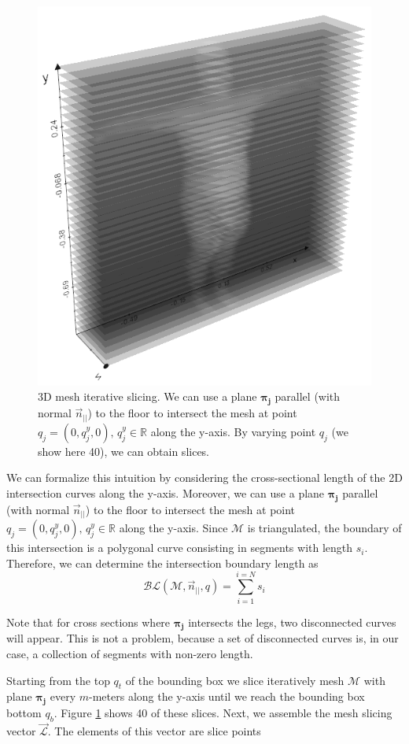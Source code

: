 \documentclass[runningheads, orivec]{llncs}
\begin{document}
\begin{figure}[H]
	\begin{center}
		\includegraphics[width=0.5\linewidth]{subject_2_with_cutting_planes_xrays.png}
	\end{center}
	\caption{3D mesh iterative slicing. We 
		can use a plane $\boldsymbol{\pi_j}$ parallel (with normal 
		$\vec{n}_{||}$) to the 
		floor to intersect the mesh at point $q_j = (0, q^y_j, 0), \,  q^y_j 
		\in 
		\mathbb{R}$ along the y-axis. By varying point $q_j$ (we show here 40), 
		we can obtain 
		slices.}
	\label{fig:subjects_planes_xrays}
\end{figure}

We 
can formalize this intuition by considering the cross-sectional length of the 
2D intersection curves along the y-axis. Moreover, we 
can 
use a plane $\boldsymbol{\pi_j}$ parallel (with normal $\vec{n}_{||}$) to the 
floor to intersect the mesh at point $q_j = (0, q^y_j, 0), \,  q^y_j \in 
\mathbb{R}$ along the y-axis. Since $\mathcal{M}$ is triangulated, the boundary 
of this 
intersection is a polygonal curve consisting in segments with length $s_i$. 
Therefore, we 
can 
determine the intersection boundary length as
\begin{equation}\label{eq:boundary_length}
\mathcal{BL}(\mathcal{M}, \vec{n}_{||}, q) = \sum_{i = 
	1}^{i = N}s_i
\end{equation}

Note that for cross sections where $\boldsymbol{\pi_j}$ intersects the legs, 
two 
disconnected curves will appear. This is not a problem, because a 
set of disconnected curves is, in our case, a collection of segments with 
non-zero length.

Starting 
from the 
top $q_t$ of the bounding box we slice iteratively mesh $\mathcal{M}$ with 
plane 
$\boldsymbol{\pi_j}$ every $m$-meters along the y-axis until we reach the 
bounding box bottom 
$q_b$. Figure \ref{fig:subjects_planes_xrays} shows 40 of these 
slices. Next, we assemble the mesh slicing vector $\vec{\mathcal{L}}$. The 
elements of 
this vector are slice points
\end{document}
